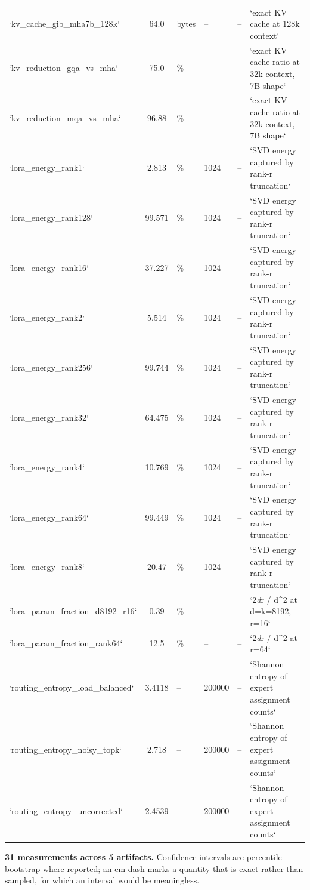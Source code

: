 \documentclass[10pt,journal,compsoc,twocolumn]{IEEEtran}
\begin{document}
\begin{table}[htbp]
{\begin{tabular}{lcllll}
`kv\_cache\_gib\_mha7b\_128k` & 64.0 & bytes & -- & -- & `exact KV cache at 128k context` \\
`kv\_reduction\_gqa\_vs\_mha` & 75.0 & \% & -- & -- & `exact KV cache ratio at 32k context, 7B shape` \\
`kv\_reduction\_mqa\_vs\_mha` & 96.88 & \% & -- & -- & `exact KV cache ratio at 32k context, 7B shape` \\
`lora\_energy\_rank1` & 2.813 & \% & 1024 & -- & `SVD energy captured by rank-r truncation` \\
`lora\_energy\_rank128` & 99.571 & \% & 1024 & -- & `SVD energy captured by rank-r truncation` \\
`lora\_energy\_rank16` & 37.227 & \% & 1024 & -- & `SVD energy captured by rank-r truncation` \\
`lora\_energy\_rank2` & 5.514 & \% & 1024 & -- & `SVD energy captured by rank-r truncation` \\
`lora\_energy\_rank256` & 99.744 & \% & 1024 & -- & `SVD energy captured by rank-r truncation` \\
`lora\_energy\_rank32` & 64.475 & \% & 1024 & -- & `SVD energy captured by rank-r truncation` \\
`lora\_energy\_rank4` & 10.769 & \% & 1024 & -- & `SVD energy captured by rank-r truncation` \\
`lora\_energy\_rank64` & 99.449 & \% & 1024 & -- & `SVD energy captured by rank-r truncation` \\
`lora\_energy\_rank8` & 20.47 & \% & 1024 & -- & `SVD energy captured by rank-r truncation` \\
`lora\_param\_fraction\_d8192\_r16` & 0.39 & \% & -- & -- & `2\textit{d}r / d^2 at d=k=8192, r=16` \\
`lora\_param\_fraction\_rank64` & 12.5 & \% & -- & -- & `2\textit{d}r / d^2 at r=64` \\
`routing\_entropy\_load\_balanced` & 3.4118 & -- & 200000 & -- & `Shannon entropy of expert assignment counts` \\
`routing\_entropy\_noisy\_topk` & 2.718 & -- & 200000 & -- & `Shannon entropy of expert assignment counts` \\
`routing\_entropy\_uncorrected` & 2.4539 & -- & 200000 & -- & `Shannon entropy of expert assignment counts` \\
\bottomrule
\end{tabular}}
\end{table}

\textbf{31 measurements across 5 artifacts.} Confidence intervals are percentile bootstrap where reported; an em dash marks a quantity that is exact rather than sampled, for which an interval would be meaningless.
\end{document}

